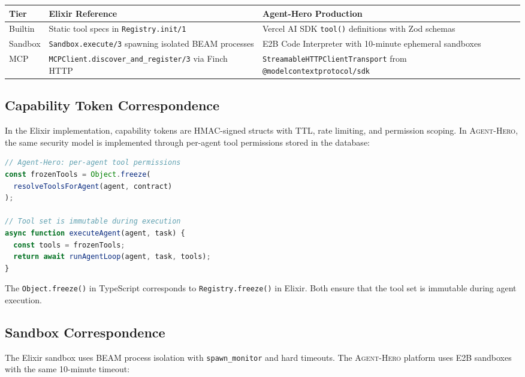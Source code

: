 \documentclass[12pt,a4paper]{article}
\theoremstyle{plain}
\theoremstyle{definition}
\newcommand{\agenthero}{\textsc{Agent-Hero}}
\begin{document}
\begin{center}
\begin{tabularx}{\textwidth}{lXX}
\toprule
\textbf{Tier} & \textbf{Elixir Reference} & \textbf{Agent-Hero Production} \\
\midrule
Builtin & Static tool specs in \texttt{Registry.init/1} & Vercel AI SDK \texttt{tool()} definitions with Zod schemas \\
Sandbox & \texttt{Sandbox.execute/3} spawning isolated BEAM processes & E2B Code Interpreter with 10-minute ephemeral sandboxes \\
MCP & \texttt{MCPClient.discover\_and\_register/3} via Finch HTTP & \texttt{StreamableHTTPClientTransport} from \texttt{@modelcontextprotocol/sdk} \\
\bottomrule
\end{tabularx}
\end{center}

\subsection{Capability Token Correspondence}

In the Elixir implementation, capability tokens are HMAC-signed structs with TTL, rate limiting, and permission scoping. In \agenthero{}, the same security model is implemented through per-agent tool permissions stored in the database:

\begin{lstlisting}[language=typescript, caption={Agent-Hero tool permission model (simplified).}, label={lst:ah-permissions}]
// Agent-Hero: per-agent tool permissions
const frozenTools = Object.freeze(
  resolveToolsForAgent(agent, contract)
);

// Tool set is immutable during execution
async function executeAgent(agent, task) {
  const tools = frozenTools;
  return await runAgentLoop(agent, task, tools);
}
\end{lstlisting}

The \texttt{Object.freeze()} in TypeScript corresponds to \texttt{Registry.freeze()} in Elixir. Both ensure that the tool set is immutable during agent execution.

\subsection{Sandbox Correspondence}

The Elixir sandbox uses BEAM process isolation with \texttt{spawn\_monitor} and hard timeouts. The \agenthero{} platform uses E2B sandboxes with the same 10-minute timeout:
\end{document}
